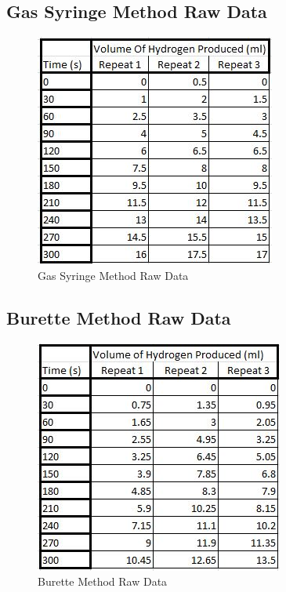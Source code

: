 \subsection{Gas Syringe Method Raw Data}
\begin{figure}[H]
    \includegraphics[width=\textwidth]{./preliminarywork/images/GasSyringeRawData.jpg}
    \caption{Gas Syringe Method Raw Data} \label{fig:GasSyringeRawData}
\end{figure}

\subsection{Burette Method Raw Data}\begin{figure}[H]
    \includegraphics[width=\textwidth]{./preliminarywork/images/BuretteRawData.jpg}
    \caption{Burette Method Raw Data} \label{fig:BuretteRawData}
\end{figure}

